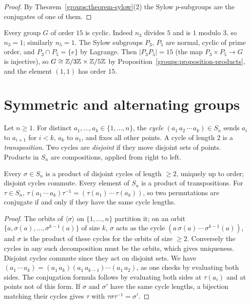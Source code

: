 \begin{proof}
By Theorem~\ref{groups:theorem-sylow}(2) the Sylow $p$-subgroups are the
conjugates of one of them.
\end{proof}

\begin{example}\label{groups:example-order-15}
Every group $G$ of order $15$ is cyclic. Indeed $n_3$ divides $5$ and is $1$
modulo $3$, so $n_3 = 1$; similarly $n_5 = 1$. The Sylow subgroups $P_3$, $P_5$ are
normal, cyclic of prime order, and $P_3 \cap P_5 = \{e\}$ by Lagrange. Then
$|P_3P_5| = 15$ (the map $P_3 \times P_5 \to G$ is injective), so
$G \cong \mathbb{Z}/3\mathbb{Z} \times \mathbb{Z}/5\mathbb{Z}$ by Proposition~\ref{groups:proposition-products},
and the element $(1, 1)$ has order $15$.
\end{example}

\section{Symmetric and alternating groups}\label{groups:section-symmetric}

\begin{definition}\label{groups:definition-cycles}
Let $n \geq 1$. For distinct $a_1, \ldots, a_k \in \{1, \ldots, n\}$, the \emph{cycle}
$(a_1\, a_2\, \cdots\, a_k) \in S_n$ sends $a_i$ to $a_{i+1}$ for $i < k$, $a_k$ to $a_1$,
and fixes all other points. A cycle of length $2$ is a \emph{transposition}. Two
cycles are \emph{disjoint} if they move disjoint sets of points. Products in $S_n$
are compositions, applied from right to left.
\end{definition}

\begin{proposition}\label{groups:proposition-cycle-decomposition}
Every $\sigma \in S_n$ is a product of disjoint cycles of length $\geq 2$, uniquely up
to order; disjoint cycles commute. Every element of $S_n$ is a product of
transpositions. For $\tau \in S_n$,
$\tau (a_1\, \cdots\, a_k) \tau^{-1} = (\tau(a_1)\, \cdots\, \tau(a_k))$, so two
permutations are conjugate if and only if they have the same cycle lengths.
\end{proposition}

\begin{proof}
The orbits of $\langle \sigma \rangle$ on $\{1, \ldots, n\}$ partition it; on an orbit
$\{a, \sigma(a), \ldots, \sigma^{k-1}(a)\}$ of size $k$, $\sigma$ acts as the cycle
$(a\, \sigma(a)\, \cdots\, \sigma^{k-1}(a))$, and $\sigma$ is the product of these cycles for
the orbits of size $\geq 2$. Conversely the cycles in any such decomposition must be
the orbits, which gives uniqueness. Disjoint cycles commute since they act on
disjoint sets. We have $(a_1\, \cdots\, a_k) = (a_1\, a_k)(a_1\, a_{k-1}) \cdots (a_1\, a_2)$,
as one checks by evaluating both sides. The conjugation formula follows by
evaluating both sides at $\tau(a_i)$ and at points not of this form. If $\sigma$ and
$\sigma'$ have the same cycle lengths, a bijection matching their cycles gives $\tau$
with $\tau\sigma\tau^{-1} = \sigma'$.
\end{proof}

